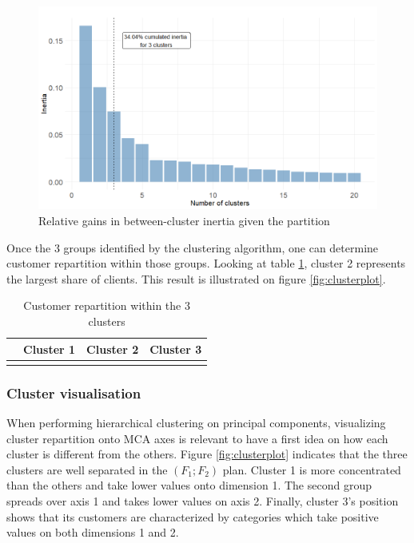 \documentclass[
]{book}
\begin{document}
\begin{figure}

{\centering \includegraphics[width=13.89in]{./imgs/btw_inertia} 

}

\caption{Relative gains in between-cluster inertia given the partition}\label{fig:btwinertia}
\end{figure}

Once the 3 groups identified by the clustering algorithm, one can determine customer repartition within those groups. Looking at table \ref{tab:clustRepartition}, cluster 2 represents the largest share of clients. This result is illustrated on figure \ref{fig:clusterplot}.

\begin{table}[H]

\caption{\label{tab:clustRepartition}Customer repartition within the 3 clusters}
\centering
\begin{tabular}[t]{lrrr}
\toprule
  & Cluster 1 & Cluster 2 & Cluster 3\\
\midrule
\cellcolor{gray!6}{\%} & \cellcolor{gray!6}{26.55} & \cellcolor{gray!6}{41.38} & \cellcolor{gray!6}{32.07}\\
\bottomrule
\end{tabular}
\end{table}

\hypertarget{cluster-visualisation}{%
\subsubsection*{Cluster visualisation}\label{cluster-visualisation}}

When performing hierarchical clustering on principal components, visualizing cluster repartition onto MCA axes is relevant to have a first idea on how each cluster is different from the others. Figure \ref{fig:clusterplot} indicates that the three clusters are well separated in the \((F_1 ; F_2)\) plan. Cluster 1 is more concentrated than the others and take lower values onto dimension 1. The second group spreads over axis 1 and takes lower values on axis 2. Finally, cluster 3's position shows that its customers are characterized by categories which take positive values on both dimensions 1 and 2.
\end{document}
